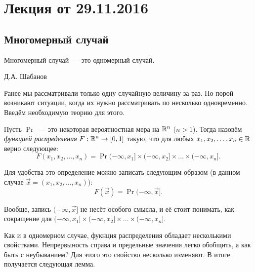 \section{Лекция от 29.11.2016}
\subsection{Многомерный случай}
\epigraph{Многомерный случай~--- это одномерный случай.}{Д.А. Шабанов}
Ранее мы рассматривали только одну случайную величину за раз. Но порой возникают ситуации, когда их нужно рассматривать по несколько одновременно. Введём необходимую теорию для этого.

\begin{definition}
	Пусть \(\Pr\)~--- это некоторая вероятностная мера на \(\mathbb{R}^{n}\) (\(n > 1\)). Тогда назовём \emph{функцией распределения} \(F: \mathbb{R}^{n} \to [0, 1]\) такую, что для любых \(x_1, x_2, \dots, x_n \in \mathbb{R}\) верно следующее:
	\[
	F(x_1, x_2, \dots, x_n) = \Pr{(-\infty, x_1] \times (-\infty, x_2] \times \dots \times (-\infty, x_n]}.
	\]
\end{definition}
\begin{remark}
	Для удобства это определение можно записать следующим образом (в данном случае \(\vec{x} = (x_1, x_2, \dots, x_n)\)):
	\[
	F(\vec{x}) = \Pr{(-\infty, \vec{x}]}.
	\]
	
	Вообще, запись \((-\infty, \vec{x}]\) не несёт особого смысла, и её стоит понимать, как сокращение для \((-\infty, x_1] \times (-\infty, x_2] \times \dots \times (-\infty, x_n]\).
\end{remark}

Как и в одномерном случае, фукнция распределения обладает несколькими свойствами. Непрервыность справа и предельные значения легко обобщить, а как быть с неубыванием? Для этого это свойство несколько изменяют. В итоге получается следующая лемма.

